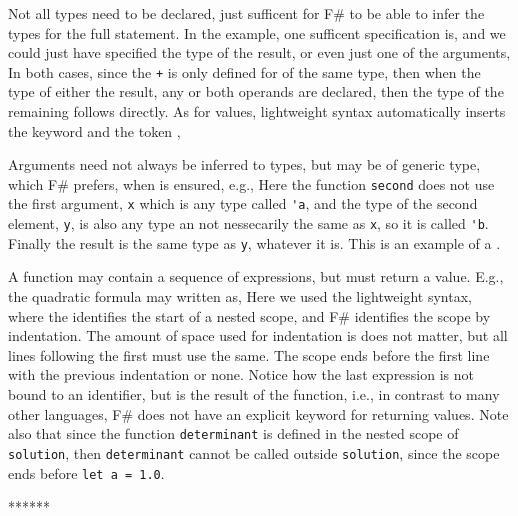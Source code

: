 Not all types need to be declared, just sufficent for F\# to be able to infer the types for the full statement. In the example, one sufficent specification is, and we could just have specified the type of the result,
%
%
or even just one of the arguments,
%
%
In both cases, since the \lstinline|+|  is only defined for  of the same type, then when the type of either the result, any or both operands are declared, then the type of the remaining follows directly.  As for values, lightweight syntax automatically inserts the keyword  and the token \token{;},
%
%

Arguments need not always be inferred to types, but may be of generic type, which F\# prefers, when  is ensured, e.g.,
%
%
Here the function \lstinline{second} does not use the first argument, \lstinline{x} which is any type called \lstinline{'a}, and the type of the second element, \lstinline{y}, is also any type an not nessecarily the same as \lstinline!x!, so it is called \lstinline!'b!. Finally the result is the same type as \lstinline!y!, whatever it is. This is an example of a .

A function may contain a sequence of expressions, but must return a value. E.g., the quadratic formula may written as, 
%
%
Here we used the lightweight syntax, where the \token{=} identifies the start of a nested scope, and F\# identifies the scope by indentation. The amount of space used for indentation is does not matter, but all lines following the first must use the same. The scope ends before the first line with the previous indentation or none. Notice how the last expression is not bound to an identifier, but is the result of the function, i.e., in contrast to many other languages, F\# does not have an explicit keyword for returning values. Note also that since the function \lstinline!determinant! is defined in the nested scope of \lstinline!solution!, then  \lstinline!determinant! cannot be called outside \lstinline!solution!, since the scope ends before \lstinline!let a = 1.0!.

******



